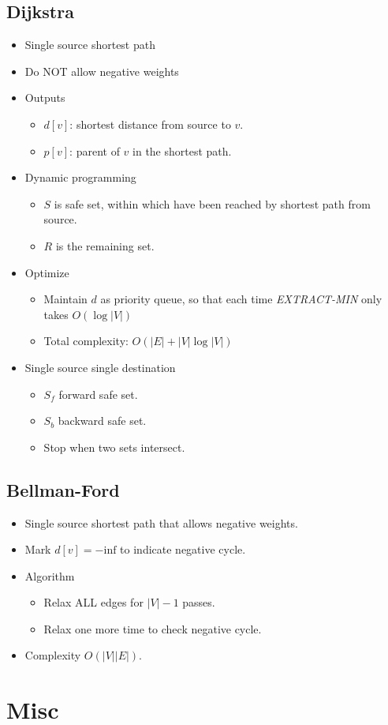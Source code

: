 \documentclass[twocolumn]{article}
\begin{document}
\subsection{Dijkstra}
\begin{itemize}
\item Single source shortest path
\item Do NOT allow negative weights
\item Outputs
  \begin{itemize}
  \item $d[v]$: shortest distance from source to $v$.
  \item $p[v]$: parent of $v$ in the shortest path.
  \end{itemize}
\item Dynamic programming
  \begin{itemize}
  \item $S$ is safe set, within which have been reached by shortest path from source.
  \item $R$ is the remaining set.
  \end{itemize}
\item Optimize
  \begin{itemize}
  \item Maintain $d$ as priority queue, so that each time \textit{EXTRACT-MIN} only takes $O(\log|V|)$
  \item Total complexity: $O(|E|+|V|\log|V|)$
  \end{itemize}
\item Single source single destination
  \begin{itemize}
  \item $S_f$ forward safe set.
  \item $S_b$ backward safe set.
  \item Stop when two sets intersect.
  \end{itemize}
\end{itemize}


\subsection{Bellman-Ford}
\begin{itemize}
\item Single source shortest path that allows negative weights.
\item Mark $d[v]=-\text{inf}$ to indicate negative cycle.
\item Algorithm
  \begin{itemize}
  \item Relax ALL edges for $|V|-1$ passes.
  \item Relax one more time to check negative cycle.
  \end{itemize}
\item Complexity $O(|V||E|)$.
\end{itemize}


\section{Misc}


\end{document}
